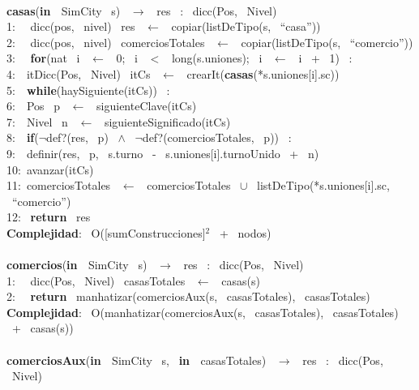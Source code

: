 \begin{Algoritmos}
\makebox[\linewidth]{\rule{\textwidth}{0.4pt}}
\\
\makebox[\linewidth]{\rule{\textwidth}{0.4pt}}
\textbf{casas}(\textbf{in \ }SimCity \ s) \ $\rightarrow $ \ res \ : \ dicc(Pos, \ Nivel)\\
1: \  \ dicc(pos, \ nivel) \ res \ $\leftarrow$ \ copiar(listDeTipo(s, \ ``casa''))\\
2: \  \ dicc(pos, \ nivel) \ comerciosTotales \ $\leftarrow$ \ copiar(listDeTipo(s, \ ``comercio''))\\
3: \  \ \textbf{for}(nat \ i \ $\leftarrow$ \ 0; \ i \ $<$ \ long(s.uniones); \ i \ $\leftarrow$ \ i \ + \ 1) \ : \ \\
4:\indent  \  \ itDicc(Pos, \ Nivel) \ itCs \ $\leftarrow$ \ crearIt(\textbf{casas}(*s.uniones[i].sc))\\
5:\indent  \  \ \textbf{while}(haySiguiente(itCs)) \ :\\
6:\indent \indent  \  \ Pos \ p \ $\leftarrow$ \ siguienteClave(itCs)\\
7:\indent \indent  \  \ Nivel \ n \ $\leftarrow$ \ siguienteSignificado(itCs)\\
8:\indent \indent  \  \ \textbf{if}($\neg$def?(res, \ p) \ $\wedge$ \ $\neg$def?(comerciosTotales, \ p)) \ :\\
9:\indent \indent \indent  \  \ definir(res, \ p, \ s.turno \ - \ s.uniones[i].turnoUnido \ + \ n)\\
10:\indent \indent  \ avanzar(itCs)\\
11:\indent  \ comerciosTotales \ $\leftarrow$ \ comerciosTotales \ $\cup$ \ listDeTipo(*s.uniones[i].sc, \ ``comercio'')\\
12: \ \textbf{return} \ res\\
\textbf{Complejidad}: \ O([sumConstrucciones]$^2$ \ + \ nodos)\\
\makebox[\linewidth]{\rule{\textwidth}{0.4pt}}
\\
\makebox[\linewidth]{\rule{\textwidth}{0.4pt}}
\textbf{comercios}(\textbf{in \ }SimCity \ s) \ $\rightarrow $ \ res \ : \ dicc(Pos, \ Nivel)\\
1: \  \ dicc(Pos, \ Nivel) \ casasTotales \ $\leftarrow$ \ casas(s)\\
2: \  \ \textbf{return} \ manhatizar(comerciosAux(s, \ casasTotales), \ casasTotales)\\
\textbf{Complejidad}: \ O(manhatizar(comerciosAux(s, \ casasTotales), \ casasTotales) \ + \ casas(s))\\
\\
\textbf{comerciosAux}(\textbf{in \ }SimCity \ s, \ \textbf{in \ }casasTotales) \ $\rightarrow $ \ res \ : \ dicc(Pos, \ Nivel)\\

\end{Algoritmos}
